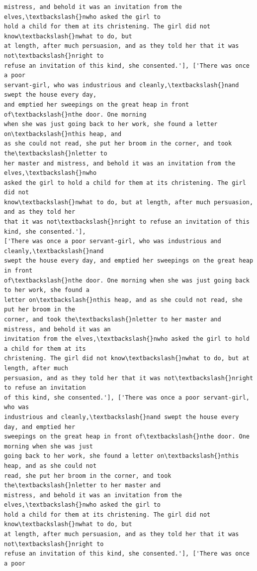 \documentclass[11pt]{article}
\begin{document}
\begin{Verbatim}[commandchars=\\\{\}]
mistress, and behold it was an invitation from the elves,\textbackslash{}nwho asked the girl to
hold a child for them at its christening. The girl did not know\textbackslash{}nwhat to do, but
at length, after much persuasion, and as they told her that it was not\textbackslash{}nright to
refuse an invitation of this kind, she consented.'], ['There was once a poor
servant-girl, who was industrious and cleanly,\textbackslash{}nand swept the house every day,
and emptied her sweepings on the great heap in front of\textbackslash{}nthe door. One morning
when she was just going back to her work, she found a letter on\textbackslash{}nthis heap, and
as she could not read, she put her broom in the corner, and took the\textbackslash{}nletter to
her master and mistress, and behold it was an invitation from the elves,\textbackslash{}nwho
asked the girl to hold a child for them at its christening. The girl did not
know\textbackslash{}nwhat to do, but at length, after much persuasion, and as they told her
that it was not\textbackslash{}nright to refuse an invitation of this kind, she consented.'],
['There was once a poor servant-girl, who was industrious and cleanly,\textbackslash{}nand
swept the house every day, and emptied her sweepings on the great heap in front
of\textbackslash{}nthe door. One morning when she was just going back to her work, she found a
letter on\textbackslash{}nthis heap, and as she could not read, she put her broom in the
corner, and took the\textbackslash{}nletter to her master and mistress, and behold it was an
invitation from the elves,\textbackslash{}nwho asked the girl to hold a child for them at its
christening. The girl did not know\textbackslash{}nwhat to do, but at length, after much
persuasion, and as they told her that it was not\textbackslash{}nright to refuse an invitation
of this kind, she consented.'], ['There was once a poor servant-girl, who was
industrious and cleanly,\textbackslash{}nand swept the house every day, and emptied her
sweepings on the great heap in front of\textbackslash{}nthe door. One morning when she was just
going back to her work, she found a letter on\textbackslash{}nthis heap, and as she could not
read, she put her broom in the corner, and took the\textbackslash{}nletter to her master and
mistress, and behold it was an invitation from the elves,\textbackslash{}nwho asked the girl to
hold a child for them at its christening. The girl did not know\textbackslash{}nwhat to do, but
at length, after much persuasion, and as they told her that it was not\textbackslash{}nright to
refuse an invitation of this kind, she consented.'], ['There was once a poor

\end{Verbatim}
\end{document}
